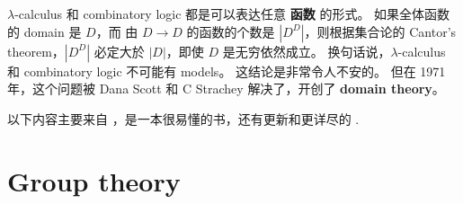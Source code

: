 \documentclass[12pt, orivec]{article}
\begin{document}
$\lambda$-calculus 和 combinatory logic 都是可以表达任意 \textbf{函数} 的形式。 如果全体函数的 domain 是 $D$，而 由 $D \rightarrow D$ 的函数的个数是 $|D^D|$，则根据集合论的 Cantor's theorem，$|D^D|$ 必定大於 $|D|$，即使 $D$ 是无穷依然成立。 换句话说，$\lambda$-calculus 和 combinatory logic 不可能有 models。  这结论是非常令人不安的。 但在 1971 年，这个问题被 Dana Scott 和 C Strachey 解决了，开创了 \textbf{domain theory}。

以下内容主要来自 \parencite{Vickers1989}，是一本很易懂的书，还有更新和更详尽的 \parencite{Goubault-Larrecq2013}.



\section{Group theory}

\printbibliography
\end{document}

